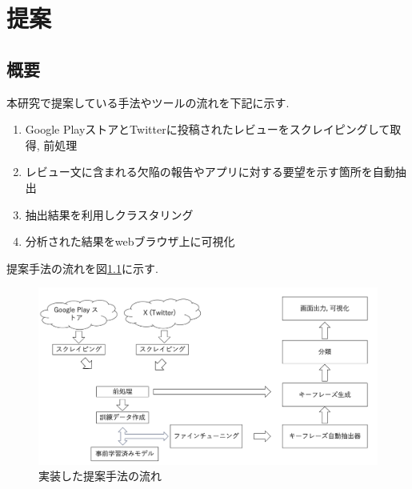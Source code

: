 \chapter{提案}
\label{chap:teian}


\section{概要}
本研究で提案している手法やツールの流れを下記に示す. 

\begin{enumerate}
  \item Google PlayストアとTwitterに投稿されたレビューをスクレイピングして取得, 前処理
  \item レビュー文に含まれる欠陥の報告やアプリに対する要望を示す箇所を自動抽出
  \item 抽出結果を利用しクラスタリング
  \item 分析された結果をwebブラウザ上に可視化
\end{enumerate}

提案手法の流れを図\ref{fig:nagare}に示す. 

\begin{figure}[H]
  \centering
  \includegraphics[scale=0.25]
       {contents/images/zisso_nagare.png}
  \caption{実装した提案手法の流れ\label{fig:nagare}}
\end{figure}


